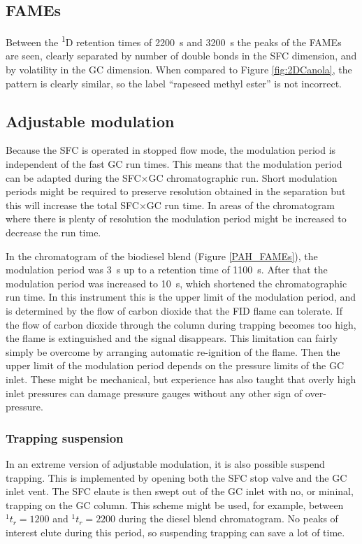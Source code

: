 \subsection{FAMEs}

Between the \textsuperscript{1}D retention times of \SI{2200}{\second} and
\SI{3200}{\second} the peaks of the FAMEs are seen, clearly separated by number
of double bonds in the SFC dimension, and by volatility in the GC dimension.
When compared to Figure \ref{fig:2DCanola}, the pattern is clearly similar, so
the label ``rapeseed methyl ester'' is not incorrect.

\subsection{Adjustable modulation}

Because the SFC is operated in stopped flow mode, the modulation period is
independent of the fast GC run times. This means that the modulation period can
be adapted during the SFC×GC chromatographic run. Short modulation periods might
be required to preserve resolution obtained in the \oneD separation but this
will increase the total SFC×GC run time. In areas of the chromatogram where
there is plenty of resolution the modulation period might be increased to
decrease the run time.

In the chromatogram of the biodiesel blend (Figure \ref{PAH_FAMEs}), the modulation period was
\SI{3}{\second} up to a \oneD retention time of \SI{1100}{s}. After that the
modulation period was increased to \SI{10}{\second}, which shortened the
chromatographic run time. In this instrument this is the upper limit of the
modulation period, and is determined by the flow of carbon dioxide that the FID
flame can tolerate. If the flow of carbon dioxide through the column during
trapping becomes too high, the flame is extinguished and the signal disappears.
This limitation can fairly simply be overcome by arranging automatic re-ignition
of the flame. Then the upper limit of the modulation period depends on the
pressure limits of the GC inlet. These might be mechanical, but experience has
also taught that overly high inlet pressures can damage pressure gauges without
any other sign of over-pressure.

\subsubsection{Trapping suspension}

In an extreme version of adjustable modulation, it is also possible  suspend
trapping. This is implemented by opening both the SFC stop valve and the GC
inlet vent. The SFC elaute is then swept out of the GC inlet with no, or
mininal, trapping on the GC column. This scheme might be used, for example,
between \(^{1}t_r = 1200\) and \(^{1}t_r = 2200\) during the diesel blend
chromatogram. No peaks of interest elute during this period, so suspending
trapping can save a lot of time.

